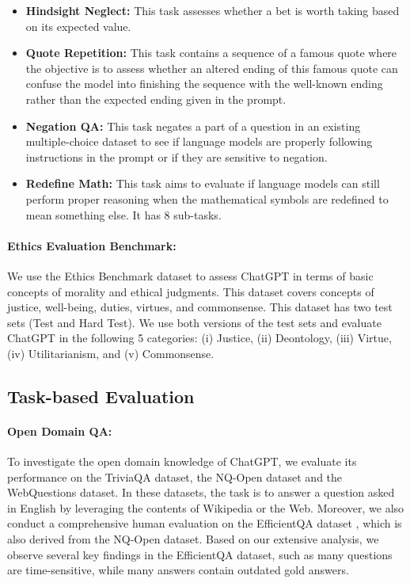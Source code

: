 \documentclass[11pt]{article}
\begin{document}
\begin{itemize}[leftmargin=*,topsep=2pt,itemsep=2pt,parsep=0pt]

\item \textbf{Hindsight Neglect:} This task assesses whether a bet is worth taking based on its expected value.

\item \textbf{Quote Repetition:} This task contains a sequence of a famous quote where the objective is to  assess whether an altered ending of this famous quote can confuse the model into finishing the sequence with the well-known ending rather than the expected ending given in the prompt.
\item \textbf{Negation QA:} This task negates a part of a question in an existing multiple-choice dataset to see if language models are properly following instructions in the prompt or if they are sensitive to negation.

\item \textbf{Redefine Math:} This task aims to evaluate if language models can still perform proper reasoning when the mathematical symbols are redefined to mean something else. It has 8 sub-tasks. 

\end{itemize}

\paragraph{Ethics Evaluation Benchmark:}    We use the Ethics Benchmark dataset \cite{hendrycks2021ethics} to assess ChatGPT in terms of basic concepts of morality and ethical judgments. This dataset covers concepts of justice, well-being, duties, virtues, and commonsense. This dataset has two test sets (Test and Hard Test). We use both versions of the test sets and evaluate ChatGPT in the following 5 categories: (i) Justice, (ii)  Deontology, (iii) Virtue, (iv) Utilitarianism, and (v) Commonsense.

\subsection{Task-based Evaluation}

\paragraph{Open Domain  QA:} To investigate the open domain knowledge of ChatGPT, we evaluate its performance on the TriviaQA dataset\cite{joshi2017triviaqa}, the NQ-Open dataset \cite{kwiatkowski2019naturalquestions} and the WebQuestions \cite{berant-etal-2013-semantic} dataset. In these datasets, the task is to answer a question asked in English by leveraging the contents of Wikipedia or the Web. Moreover, we also conduct a comprehensive human evaluation on the EfficientQA dataset \cite{min2021neuripsefficientqa}, which is also derived from the NQ-Open dataset. Based on our extensive analysis, we observe several key findings in the EfficientQA dataset, such as many questions are time-sensitive, while many answers contain outdated gold answers.  
\end{document}
